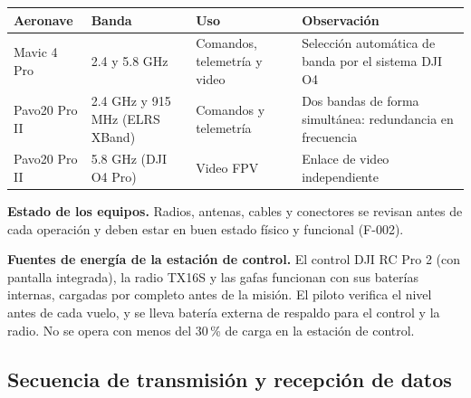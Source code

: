 \renewcommand{\arraystretch}{1.3}
\begin{longtable}{|p{3cm}|p{3.2cm}|p{3.5cm}|p{4cm}|}
\hline
\rowcolor[gray]{0.9}\textbf{Aeronave} & \textbf{Banda} & \textbf{Uso} & \textbf{Observación} \\ \hline
Mavic 4 Pro & 2.4 y 5.8 GHz & Comandos, telemetría y video & Selección automática de banda por el sistema DJI O4 \\ \hline
Pavo20 Pro II & 2.4 GHz y 915 MHz (ELRS XBand) & Comandos y telemetría & Dos bandas de forma simultánea: redundancia en frecuencia \\ \hline
Pavo20 Pro II & 5.8 GHz (DJI O4 Pro) & Video FPV & Enlace de video independiente \\ \hline
\end{longtable}

\textbf{Estado de los equipos.} Radios, antenas, cables y conectores se revisan antes de cada operación y deben estar en buen estado físico y funcional (F-002).

\textbf{Fuentes de energía de la estación de control.} El control DJI RC Pro 2 (con pantalla integrada), la radio TX16S y las gafas funcionan con sus baterías internas, cargadas por completo antes de la misión. El piloto verifica el nivel antes de cada vuelo, y se lleva batería externa de respaldo para el control y la radio. No se opera con menos del 30\,\% de carga en la estación de control.

\subsection{Secuencia de transmisión y recepción de datos}

\begin{center}
\end{center}


